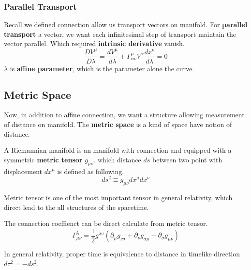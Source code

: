 \documentclass[12pt]{article}
\theoremstyle{mystyle}{\newtheorem{definition}{Definition}[section]}
\theoremstyle{mystyle}{\newtheorem{theorem}[definition]{Theorem}}
\theoremstyle{mystyle}{\newtheorem*{remark}{Remark}}
\theoremstyle{mystyle}{\newtheorem*{example}{Example}}
\theoremstyle{mystyle}{\newtheorem*{examples}{Examples}}
\theoremstyle{cstyle}{\newtheorem*{cthm}{}}
\begin{document}
\subsubsection{Parallel Transport}
Recall we defined connection allow us transport vectors on manifold.
For \textbf{parallel transport} a vector, we want each infinitesimal step of transport maintain the vector parallel.
Which required \textbf{intrinsic derivative} vanish.\[\frac{DV^{\mu}}{D\lambda} =
  \frac{dV^{\mu}}{d\lambda}+ \Gamma^{\mu}_{\alpha\nu}V^{\alpha}\frac{dx^{\nu}}{d\lambda} = 0\]
\(\lambda\) is \textbf{affine parameter}, which is the parameter alone the curve.

\subsection{Metric Space}
Now, in addition to affine connection, we want a structure allowing measurement of distance on manifold.
The \textbf{metric space} is a kind of space have notion of distance.
\begin{definition}
  A Riemannian manifold is an manifold with connection and equipped with a symmetric \textbf{metric tensor} \(g_{\mu\nu}\).
  which distance \(ds\) between two point with displacement \(dx^{\mu}\) is defined as following.
  \[ds^2 \equiv g_{\mu \nu} dx^{\mu} dx^{\nu}\]
\end{definition}
Metric tensor is one of the most important tensor in general relativity,
which direct lead to the all structures of the spacetime.
\begin{example}
  The connection coeffienct can be direct calculate from metric tensor.
  \[\Gamma_{\mu\nu}^{\lambda} = \frac{1}{2}g^{\lambda\sigma}(\partial_{\mu}g_{\nu\sigma}+ \partial_{\nu}g_{\sigma\mu}
    - \partial_{\sigma}g_{\mu\nu})\]
\end{example}
In general relativity, proper time is equivalence to distance in timelike direction \(d\tau^2 = - ds^2\).
\end{document}

